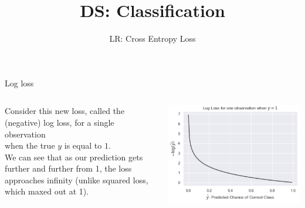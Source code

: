 \documentclass[aspectratio=169]{../latex_main/tntbeamer}  %
\title[Cross Entropy Loss]{DS: Classification}
\subtitle{LR: Cross Entropy Loss}
\begin{document}
	
	\maketitle
	\begin{frame}{Log loss}
	    \begin{columns}
	        \begin{column}{.5\textwidth}
	                Consider this new loss, called the (negative) log loss, for a single observation\\ \alert{when the true $y$ is equal to $1$.}\\
	                \bigskip
	                We can see that as our prediction gets further and further from 1, the loss approaches infinity (unlike squared loss, which maxed out at 1).
	        \end{column}
	        
	        \begin{column}{.4\textwidth}
	                    
	                    \centering
	                    \includegraphics[scale=.5]{Bild18}
	        \end{column}
	    \end{columns}
	\end{frame}
	
	
	
	
\end{document}
